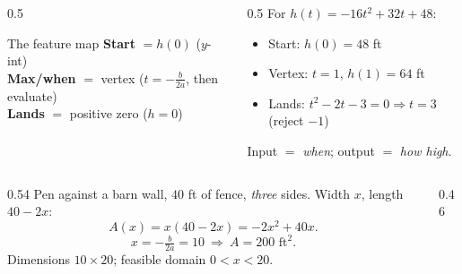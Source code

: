 \documentclass[aspectratio=169, 11pt]{beamer}
\begin{document}
\begin{frame}[t, plain]
  \begin{columns}[T]
    \begin{column}{0.5\textwidth}
      \begin{block}{The feature map}
        \textbf{Start} $=h(0)$ ($y$-int) \\
        \textbf{Max/when} $=$ vertex ($t=-\tfrac{b}{2a}$, then evaluate) \\
        \textbf{Lands} $=$ positive zero ($h=0$)
      \end{block}
    \end{column}
    \begin{column}{0.5\textwidth}
      For $h(t)=-16t^2+32t+48$:
      \begin{itemize}\setlength{\itemsep}{2pt}
        \item Start: $h(0)=48$ ft
        \item Vertex: $t=1$, $h(1)=64$ ft
        \item Lands: $t^2-2t-3=0\Rightarrow t=3$ (reject $-1$)
      \end{itemize}
      \small Input $=$ \emph{when}; output $=$ \emph{how high}.
    \end{column}
  \end{columns}
\end{frame}

\begin{frame}[t, plain]
  \begin{columns}[T]
    \begin{column}{0.54\textwidth}
      Pen against a barn wall, $40$ ft of fence, \emph{three} sides. Width $x$, length $40-2x$:
      \[ A(x)=x(40-2x)=-2x^2+40x. \]
      \[ x=-\tfrac{b}{2a}=10\ \Rightarrow\ A=200\text{ ft}^2. \]
      Dimensions $10\times20$; feasible domain $0<x<20$.
    \end{column}
    \begin{column}{0.46\textwidth}
      \centering
    \end{column}
  \end{columns}
\end{frame}
\end{document}
